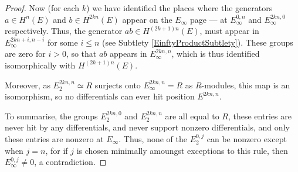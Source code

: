 \documentclass{article}
\newcommand{\Z}{\mathbb{Z}}
\renewcommand{\to}{\longrightarrow}
\theoremstyle{definition}
\begin{document}
\begin{proof}
Now (for each $k$) we have identified the places where the generators $a\in H^n(E)$ and $b\in H^{2kn}(E)$ appear on the $E_{\infty}$ page --- at $E_\infty^{0,n}$ and $E_\infty^{2kn,0}$ respectively. Thus, the generator $ab\in H^{(2k+1)n}(E)$, must appear in $E_{\infty}^{2kn+i,n-i}$ for some $i\leq n$ (see Subtlety \ref{EinftyProductSubtlety}).
These groups are zero for $i>0$, so that $ab$ appears in $E_{\infty}^{2kn,n}$, which is thus identified isomorphically with $H^{(2k+1)n}(E)$.

Moreover, as $E_2^{2kn,n}\simeq R$ surjects onto $E_\infty^{2kn,n}=R$ as $R$-modules, this map is an isomorphism, so no differentials can ever hit position $E^{2kn,n}$.

%

To summarise, the groups $E_2^{2kn,0}$ and $E_2^{2kn,n}$ are all equal to $R$, these entries are never hit by any differentials, and never support nonzero differentials, and only these entries are nonzero at $E_\infty$. Thus, none of the $E_2^{0,j}$ can be nonzero except when $j=n$, for if $j$ is chosen minimally amoungst exceptions to this rule, then $E_\infty^{0,j}\neq0$, a contradiction.
%
%
%
\end{proof}
\end{document}
